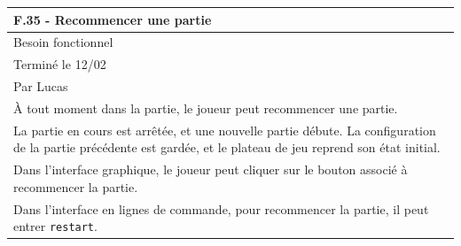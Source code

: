 \documentclass[a4paper,12pt]{article}
\begin{document}
\vspace{1cm}

\noindent
\setlength{\arrayrulewidth}{1.5pt}
\renewcommand{\arraystretch}{1.5}
\begin{tabularx}{\textwidth}{|X|}
    \hline
    \textbf{F.35 - Recommencer une partie}                                                                                                                                                                                                                              \\
    \hline
    Besoin fonctionnel                                                                                                                                                                                                                                                  \\
    \hline
    Terminé le 12/02                                                                                                                                                                                                                                                    \\
    Par Lucas                                                                                                                                                                                                                                                           \\
    \hline
    À tout moment dans la partie, le joueur peut recommencer une partie.                                                                                                                                                                                                \\
    La partie en cours est arrêtée, et une nouvelle partie débute. La configuration de la partie précédente est gardée, et le plateau de jeu reprend son état initial.                                                                                                  \\
    Dans l’interface graphique, le joueur peut cliquer sur le bouton associé à recommencer la partie.                                                                                                                                                                   \\
    Dans l’interface en lignes de commande, pour recommencer la partie, il peut entrer \texttt{restart}.                                                                                                                                                                \\

\end{tabularx}
\end{document}

